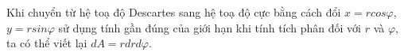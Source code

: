 \documentclass[preview]{standalone}
\begin{document}
\begin{center}
Khi chuyển từ hệ toạ độ Descartes sang hệ toạ độ cực bằng cách đổi $x=rcos\varphi$, $y=rsin\varphi$ sử dụng tính gần đúng của giới hạn khi tính tích phân đối với $r$ và $\varphi$, ta có thể viết lại $dA = rdrd\varphi$.
\end{center}
\end{document}
